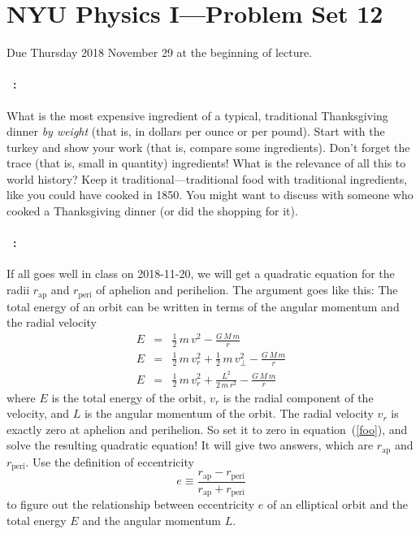 \documentclass[12pt]{article}
\newcommand{\ap}{\mathrm{ap}}
\newcommand{\peri}{\mathrm{peri}}
\begin{document}
\section*{NYU Physics I---Problem Set 12}

Due Thursday 2018 November 29 at the beginning of lecture.

\paragraph{\problemname~\theproblem:}%
What is the most expensive ingredient of a typical, traditional
Thanksgiving dinner \emph{by weight} (that is, in dollars per ounce or
per pound).  Start with the turkey and show your work (that is,
compare some ingredients). Don't forget the trace (that is, small
in quantity) ingredients!
What is the relevance of all this to world
history? Keep it traditional---traditional food with traditional
ingredients, like you could have cooked in 1850.
You might want to discuss with someone who cooked
a Thanksgiving dinner (or did the shopping for it).

\paragraph{\problemname~\theproblem:}%
If all goes well in class on 2018-11-20, we will get a quadratic equation
for the radii $r_\ap$ and $r_\peri$ of aphelion and perihelion. The argument
goes like this: The total energy of an orbit can be written in terms of the
angular momentum and the radial velocity
\begin{eqnarray}
E & = & \frac{1}{2}\,m\,v^2 - \frac{G\,M\,m}{r}
\\
E & = & \frac{1}{2}\,m\,v_r^2 + \frac{1}{2}\,m\,v_\perp^2 - \frac{G\,M\,m}{r}
\\
E & = & \frac{1}{2}\,m\,v_r^2 + \frac{L^2}{2\,m\,r^2} - \frac{G\,M\,m}{r}
\label{foo}
\end{eqnarray}
where $E$ is the total energy of the orbit, $v_r$ is the radial component of the velocity,
and $L$ is the angular momentum of the orbit.
The radial velocity $v_r$ is exactly zero at aphelion and perihelion.
So set it to zero in equation~(\ref{foo}),
and solve the resulting quadratic equation! It will give two answers,
which are $r_\ap$ and $r_\peri$.
Use the definition of eccentricity
\begin{equation}
e \equiv \frac{r_\ap - r_\peri}{r_\ap + r_\peri}
\end{equation}
to figure out
the relationship between eccentricity $e$ of an elliptical orbit and
the total energy $E$ and the angular momentum $L$.
\end{document}
